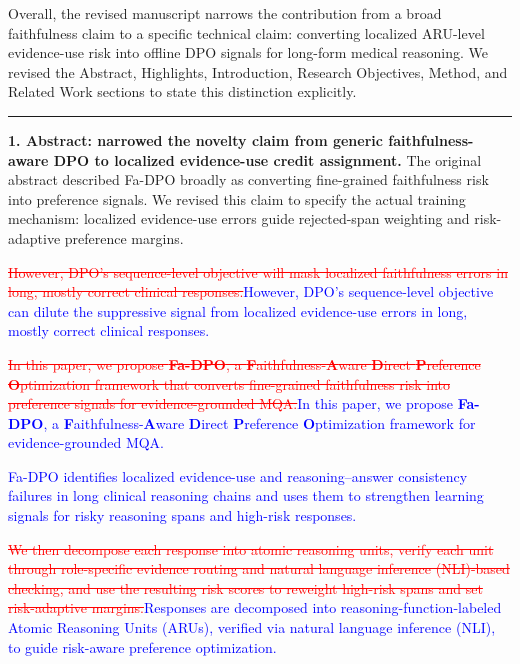 \documentclass[12pt]{article}
\newcommand{\deleted}[1]{\textcolor{red}{\sout{#1}}}
\newcommand{\added}[1]{\textcolor{blue}{#1}}
\newcommand{\responseheading}[1]{%
    \vspace{0.24cm}
    \par\noindent{\large\bfseries #1}\par
    \vspace{0.03cm}
    \noindent\rule{\linewidth}{0.35pt}\par
    \vspace{0.06cm}
    \noindent\ignorespaces
}
\begin{document}
Overall, the revised manuscript narrows the contribution from a broad faithfulness claim to a specific technical claim: converting localized ARU-level evidence-use risk into offline DPO signals for long-form medical reasoning. We revised the Abstract, Highlights, Introduction, Research Objectives, Method, and Related Work sections to state this distinction explicitly.



\responseheading{Revision Details}
\textbf{1. Abstract: narrowed the novelty claim from generic faithfulness-aware DPO to
localized evidence-use credit assignment.}
The original abstract described Fa-DPO broadly as converting fine-grained faithfulness
risk into preference signals. We revised this claim to specify the actual training
mechanism: localized evidence-use errors guide rejected-span weighting and
risk-adaptive preference margins.

\begin{displayquote}
\deleted{However, DPO's sequence-level objective will mask localized faithfulness errors in long, mostly correct clinical responses.}\added{However, DPO's sequence-level objective can dilute the suppressive signal from localized evidence-use errors in long, mostly correct clinical responses.}

\deleted{In this paper, we propose \textbf{Fa-DPO}, a \textbf{F}aithfulness-\textbf{A}ware \textbf{D}irect \textbf{P}reference \textbf{O}ptimization framework that converts fine-grained faithfulness risk into preference signals for evidence-grounded MQA.}\added{In this paper, we propose \textbf{Fa-DPO}, a \textbf{F}aithfulness-\textbf{A}ware \textbf{D}irect \textbf{P}reference \textbf{O}ptimization framework for evidence-grounded MQA.}

\added{Fa-DPO identifies localized evidence-use and reasoning--answer consistency failures in long clinical reasoning chains and uses them to strengthen learning signals for risky reasoning spans and high-risk responses.}

\deleted{We then decompose each response into atomic reasoning units, verify each unit through role-specific evidence routing and natural language inference (NLI)-based checking, and use the resulting risk scores to reweight high-risk spans and set risk-adaptive margins.}\added{Responses are decomposed into reasoning-function-labeled Atomic Reasoning Units (ARUs), verified via natural language inference (NLI), to guide risk-aware preference optimization.}
\end{displayquote}
\end{document}

